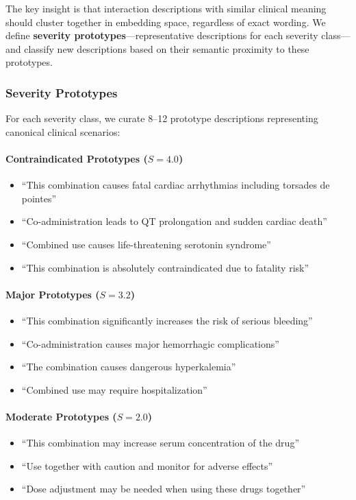 \documentclass[11pt,a4paper]{article}
\begin{document}
The key insight is that interaction descriptions with similar clinical meaning should cluster together in embedding space, regardless of exact wording. We define \textbf{severity prototypes}---representative descriptions for each severity class---and classify new descriptions based on their semantic proximity to these prototypes.

\subsubsection{Severity Prototypes}

For each severity class, we curate 8--12 prototype descriptions representing canonical clinical scenarios:

\paragraph{Contraindicated Prototypes ($S = 4.0$)}
\begin{itemize}
    \item ``This combination causes fatal cardiac arrhythmias including torsades de pointes''
    \item ``Co-administration leads to QT prolongation and sudden cardiac death''
    \item ``Combined use causes life-threatening serotonin syndrome''
    \item ``This combination is absolutely contraindicated due to fatality risk''
\end{itemize}

\paragraph{Major Prototypes ($S = 3.2$)}
\begin{itemize}
    \item ``This combination significantly increases the risk of serious bleeding''
    \item ``Co-administration causes major hemorrhagic complications''
    \item ``The combination causes dangerous hyperkalemia''
    \item ``Combined use may require hospitalization''
\end{itemize}

\paragraph{Moderate Prototypes ($S = 2.0$)}
\begin{itemize}
    \item ``This combination may increase serum concentration of the drug''
    \item ``Use together with caution and monitor for adverse effects''
    \item ``Dose adjustment may be needed when using these drugs together''
\end{itemize}
\end{document}
